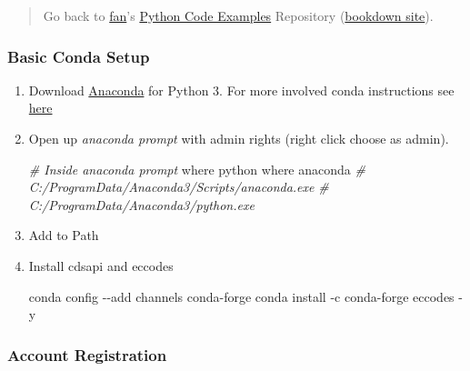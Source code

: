 \documentclass[
]{book}
\newenvironment{Shaded}{\begin{snugshade}}{\end{snugshade}}
\newcommand{\CommentTok}[1]{\textcolor[rgb]{0.56,0.35,0.01}{\textit{#1}}}
\newcommand{\ExtensionTok}[1]{#1}
\newcommand{\NormalTok}[1]{#1}
\begin{document}
\begin{quote}
Go back to \href{http://fanwangecon.github.io/}{fan}'s \href{https://fanwangecon.github.io/pyfan/}{Python Code Examples} Repository (\href{https://fanwangecon.github.io/pyfan/bookdown}{bookdown site}).
\end{quote}

\hypertarget{basic-conda-setup}{%
\subsubsection{Basic Conda Setup}\label{basic-conda-setup}}

\begin{enumerate}
\def\labelenumi{\arabic{enumi}.}
\item
  Download \href{https://www.anaconda.com/products/individual}{Anaconda} for Python 3. For more involved conda instructions see \href{https://fanwangecon.github.io/Tex4Econ/nontex/install/windows/fn_installations.html}{here}
\item
  Open up \emph{anaconda prompt} with admin rights (right click choose as admin).

\begin{Shaded}
\begin{Highlighting}[]
\CommentTok{\# Inside anaconda prompt}
\ExtensionTok{where}\NormalTok{ python}
\ExtensionTok{where}\NormalTok{ anaconda}
\CommentTok{\# C:/ProgramData/Anaconda3/Scripts/anaconda.exe}
\CommentTok{\# C:/ProgramData/Anaconda3/python.exe}
\end{Highlighting}
\end{Shaded}
\item
  Add to Path
\item
  Install cdsapi and eccodes

\begin{Shaded}
\begin{Highlighting}[]
\ExtensionTok{conda}\NormalTok{ config {-}{-}add channels conda{-}forge}
\ExtensionTok{conda}\NormalTok{ install {-}c conda{-}forge eccodes {-}y}
\end{Highlighting}
\end{Shaded}
\end{enumerate}

\hypertarget{account-registration}{%
\subsubsection{Account Registration}\label{account-registration}}
\end{document}
